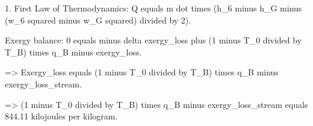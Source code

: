 1. First Law of Thermodynamics:  
Q equals m dot times (h_6 minus h_G minus (w_6 squared minus w_G squared) divided by 2).  

Exergy balance:  
0 equals minus delta exergy_loss plus (1 minus T_0 divided by T_B) times q_B minus exergy_loss.  

=> Exergy_loss equals (1 minus T_0 divided by T_B) times q_B minus exergy_loss_stream.  

=> (1 minus T_0 divided by T_B) times q_B minus exergy_loss_stream equals 844.11 kilojoules per kilogram.